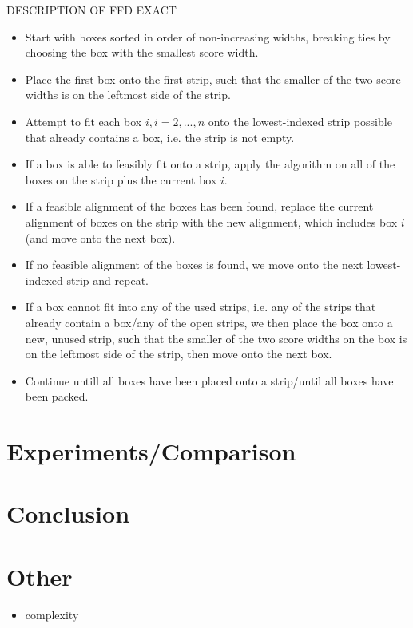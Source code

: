 \documentclass{llncs}
\begin{document}
DESCRIPTION OF FFD EXACT
\begin{itemize}
	\item Start with boxes sorted in order of non-increasing widths, breaking ties by choosing the box with the smallest score width.
	\item Place the first box onto the first strip, such that the smaller of the two score widths is on the leftmost side of the strip.
	\item Attempt to fit each box $i, i = 2,..., n$ onto the lowest-indexed strip possible that already contains a box, i.e. the strip is not empty.
	\item If a box is able to feasibly fit onto a strip, apply the \textcolor{OliveGreen}{algorithm} on all of the boxes on the strip plus the current box $i$.
	\item If a feasible alignment of the boxes has been found, replace the current alignment of boxes on the strip with the new alignment, which includes box $i$ (and move onto the next box).
	\item If no feasible alignment of the boxes is found, we move onto the next lowest-indexed strip and repeat.
	\item If a box cannot fit into any of the used strips, i.e. any of the strips that already contain a box/any of the open strips, we then place the box onto a new, unused strip, such that the smaller of the two score widths on the box is on the leftmost side of the strip, then move onto the next box.
	\item Continue untill all boxes have been placed onto a strip/until all boxes have been packed.
\end{itemize}


\section{Experiments/Comparison}

\section{Conclusion}

\section{Other}
\begin{itemize}
	\item complexity
\end{itemize}
\end{document}
